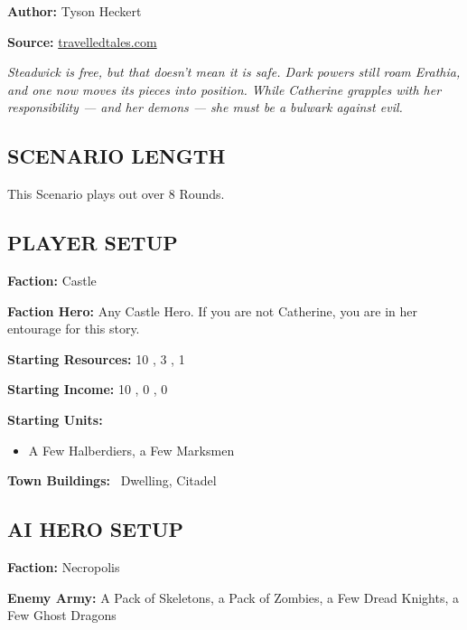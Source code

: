 \cleardoublepage{}

\begin{multicols*}{2}

\textbf{Author:} Tyson Heckert

\textbf{Source:} \href{https://travelledtales.com}{travelledtales.com}

\textit{Steadwick is free, but that doesn't mean it is safe.
Dark powers still roam Erathia, and one now moves its pieces into position.
While Catherine grapples with her responsibility — and her demons — she must be a bulwark against evil.}

\subsection*{\MakeUppercase{Scenario length}}

This Scenario plays out over 8 Rounds.

\subsection*{\MakeUppercase{Player setup}}

\textbf{Faction:} Castle

\textbf{Faction Hero:} Any Castle Hero. If you are not Catherine, you are in her entourage for this story.

\textbf{Starting Resources:} 10 , 3 , 1 

\textbf{Starting Income:} 10 , 0 , 0 

\textbf{Starting Units:}
\begin{itemize}
  \item A Few Halberdiers, a Few Marksmen
\end{itemize}

\textbf{Town Buildings:} \bronze\ Dwelling, Citadel

\subsection*{\MakeUppercase{AI Hero setup}}

\textbf{Faction:} Necropolis

\textbf{Enemy Army:} A Pack of Skeletons, a Pack of Zombies, a Few Dread Knights, a Few Ghost Dragons


\end{multicols*}
